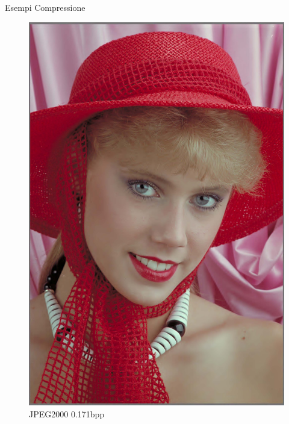 \begin{frame}{Esempi Compressione}
\begin{figure}[!ht]
\begin{minipage}[]{0.13\linewidth}
                \includegraphics[width=\textwidth]{Immagini/IMAGES/JPEG2000_2_IMG0004.pdf}
                \caption{JPEG2000 0.171bpp}
                \label{fig:ExampleJPEG2000}
            \end{minipage}
            \begin{minipage}[]{0.13\linewidth}
                \centering

\end{minipage}
\end{figure}
\end{frame}
